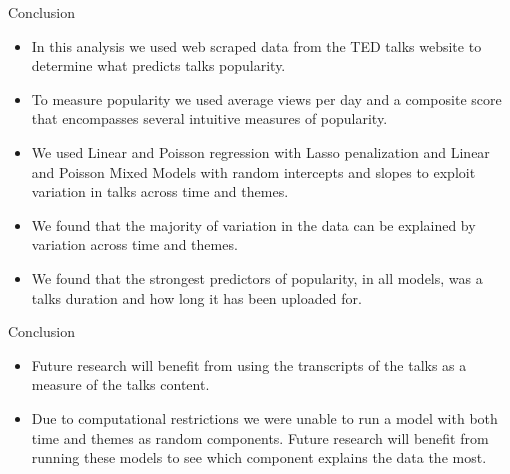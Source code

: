 \begin{frame}{Conclusion}
\begin{itemize}
\item In this analysis we used web scraped data from the TED talks website to determine what predicts talks popularity.
\item  To measure popularity we used average views per day and a composite score that encompasses several intuitive measures of popularity. 
\item We used Linear and Poisson regression with Lasso penalization and Linear and Poisson Mixed Models with random intercepts and slopes to exploit variation in talks across time and themes. 
\item We found that the majority of variation in the data can be explained by variation across time and themes. 
\item We found that the strongest predictors of popularity, in all models, was a talks duration and how long it has been uploaded for. 

\end{itemize}
\end{frame}

\begin{frame}{Conclusion}
\begin{itemize}

\item Future research will benefit from using the transcripts of the talks as a measure of the talks content. 
\item Due to computational restrictions we were unable to run a model with both time and themes as random components. Future research will benefit from running these models to see which component explains the data the most.
\end{itemize}
\end{frame}
